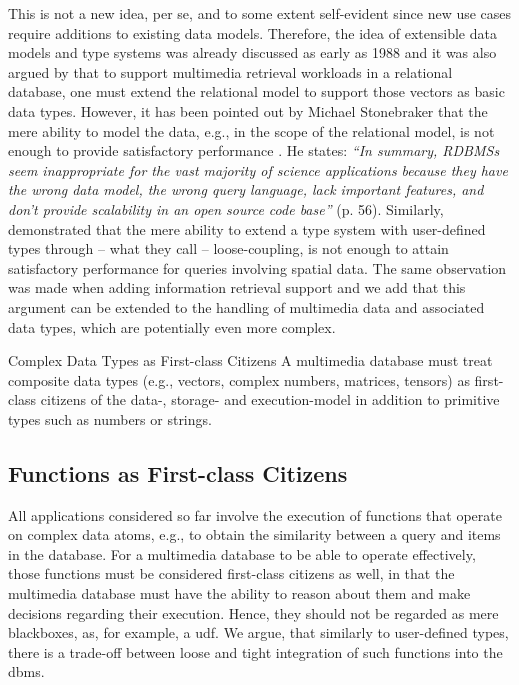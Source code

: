 This is not a new idea, per se, and to some extent self-evident since new use cases require additions to existing data models. Therefore, the idea of extensible data models and type systems was already discussed as early as 1988 \cite{Linnemann:1988Design} and it was also argued by \cite{Giangreco:2018Database} that to support multimedia retrieval workloads in a relational database, one must extend the relational model to support those vectors as basic data types. However, it has been pointed out by Michael Stonebraker that the mere ability to model the data, e.g., in the scope of the relational model, is not enough to provide satisfactory performance \cite{Stonebraker:2013SciDB}. He states: \emph{``In summary, RDBMSs seem inappropriate for the vast majority of science applications because they have the wrong data model, the wrong query language, lack important features, and don't provide scalability in an open source code base''} \cite{Stonebraker:2013SciDB} (p. 56). Similarly, \cite{Whang:2010Tightly} demonstrated that the mere ability to extend a type system with user-defined types through -- what they call -- loose-coupling, is not enough to attain satisfactory performance for queries involving spatial data. The same observation was made when adding information retrieval support \cite{Whang:2015DB} and we add that this argument can be extended to the handling of multimedia data and associated data types, which are potentially even more complex.

\begin{requirement}[label=requirement:complex_data_types]{Complex Data Types as First-class Citizens}{}
    A multimedia database must treat composite data types (e.g., vectors, complex numbers, matrices, tensors) as first-class citizens of the data-, storage- and execution-model in addition to primitive types such as numbers or strings.
\end{requirement}

\subsection{Functions as First-class Citizens}

All applications considered so far involve the execution of functions that operate on complex data atoms, e.g., to obtain the similarity between a query and items in the database. For a multimedia database to be able to operate effectively, those functions must be considered first-class citizens as well, in that the multimedia database must have the ability to reason about them and make decisions regarding their execution. Hence, they should not be regarded as mere blackboxes, as, for example, a \acrshort{udf}. We argue, that similarly to user-defined types, there is a trade-off between loose and tight integration of such functions into the \acrshort{dbms}.

